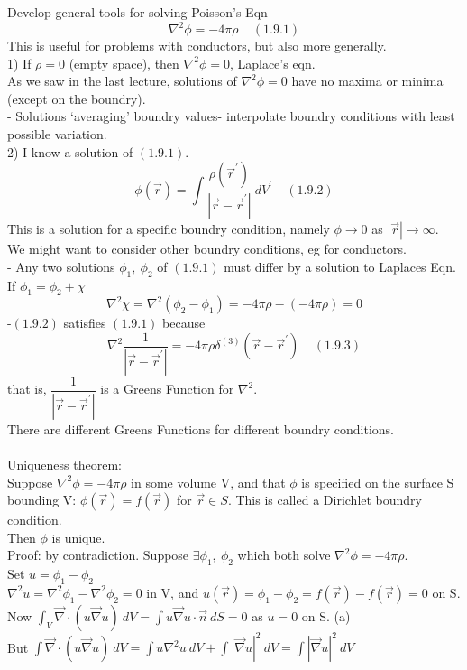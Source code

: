 \documentclass[a4paper,11pt]{article}
\newcommand{\Nab}{\vec{\nabla}}
\newcommand{\lap}{\nabla^2}
\begin{document}
Develop general tools for solving Poisson's Eqn
$$\nabla^2 \phi=-4\pi\rho~~~~~(1.9.1)$$
This is useful for problems with conductors, but also more generally.\\
1) If $\rho=0$ (empty space), then $\nabla^2 \phi=0$, Laplace's eqn.\\
As we saw in the last lecture, solutions of $\nabla^2\phi=0$ have no maxima or minima (except on the boundry).\\
- Solutions `averaging' boundry values- interpolate boundry conditions with least possible variation.\\
2) I know a solution of $(1.9.1)$.
$$\phi(\vec{r})=\int \dfrac{\rho(\vec{r}^\prime)}{|\vec{r}-\vec{r}^\prime|}~dV^\prime~~~~~(1.9.2)$$
This is a solution for a specific boundry condition, namely $\phi\rightarrow0$ as $|\vec{r}|\rightarrow\infty$.\\
We might want to consider other boundry conditions, eg for conductors.\\
- Any two solutions $\phi_1,~\phi_2$ of $(1.9.1)$ must differ by a solution to Laplaces Eqn. If $\phi_1=\phi_2+\chi$\\
$$\nabla^2\chi=\nabla^2(\phi_2-\phi_1)=-4\pi\rho-(-4\pi\rho)=0$$
-$(1.9.2)$ satisfies $(1.9.1)$ because 
$$\nabla^2 \dfrac{1}{|\vec{r}-\vec{r}^\prime|}=-4\pi\rho\delta^{(3)}(\vec{r}-\vec{r}^\prime)~~~~~(1.9.3)$$
that is, $\dfrac{1}{|\vec{r}-\vec{r}^\prime|}$ is a Greens Function for $\lap$.\\
There are different Greens Functions for different boundry conditions.\\
\\
Uniqueness theorem:\\
Suppose $\lap \phi=-4\pi\rho$ in some volume V, and that $\phi$ is specified on the surface S bounding V: $\phi(\vec{r})=f(\vec{r})$ for $\vec{r}\in S$. This is called a Dirichlet boundry condition.\\
Then $\phi$ is unique.\\
Proof: by contradiction. Suppose $\exists \phi_1,~\phi_2$ which both solve $\lap \phi=-4\pi\rho$.\\
Set $u=\phi_1-\phi_2$\\
$\lap u =\lap\phi_1-\lap\phi_2=0$ in V, and $u(\vec{r})=\phi_1-\phi_2=f(\vec{r})-f(\vec{r})=0$ on S.\\
Now $\int_V \Nab\cdot(u\Nab u)~dV=\int u\Nab u \cdot \vec{n}~dS=0 $ as $u=0$ on S. (a)\\
But $\int\Nab \cdot (u\Nab u)~dV=\int u\lap u~dV+\int |\Nab u|^2~dV=\int |\Nab u|^2~dV$\\
\end{document}
